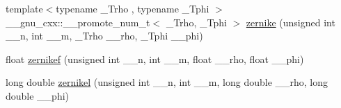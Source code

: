 \begin{DoxyCompactItemize}
\item 
{\footnotesize template$<$typename \+\_\+\+Trho , typename \+\_\+\+Tphi $>$ }\\\+\_\+\+\_\+gnu\+\_\+cxx\+::\+\_\+\+\_\+promote\+\_\+num\+\_\+t$<$ \+\_\+\+Trho, \+\_\+\+Tphi $>$ \hyperlink{namespace____gnu__cxx_ac43d89238752ed88927867236ab8c6a8}{zernike} (unsigned int \+\_\+\+\_\+n, int \+\_\+\+\_\+m, \+\_\+\+Trho \+\_\+\+\_\+rho, \+\_\+\+Tphi \+\_\+\+\_\+phi)
\item 
float \hyperlink{namespace____gnu__cxx_ababce1066ecef7258070b9b7fcea975f}{zernikef} (unsigned int \+\_\+\+\_\+n, int \+\_\+\+\_\+m, float \+\_\+\+\_\+rho, float \+\_\+\+\_\+phi)
\item 
long double \hyperlink{namespace____gnu__cxx_a9236dd8545b448da9cb05dd8b7cf6811}{zernikel} (unsigned int \+\_\+\+\_\+n, int \+\_\+\+\_\+m, long double \+\_\+\+\_\+rho, long double \+\_\+\+\_\+phi)
\end{DoxyCompactItemize}



